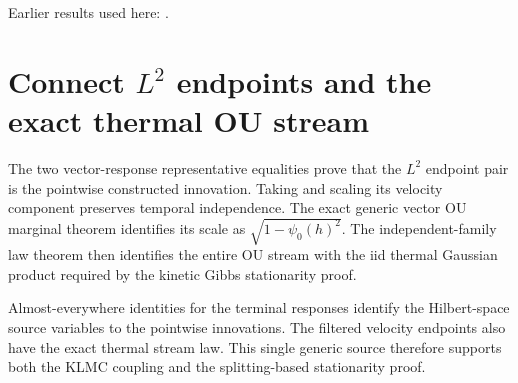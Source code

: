 \documentclass[11pt,a4paper]{article}
\begin{document}
Earlier results used here: \cite[Section~3.8.17]{LangevinLean2026ULASC}.

\section{\texorpdfstring{Connect \(L^{2}\) endpoints and the exact thermal OU stream}{Connect L² endpoints and the exact thermal OU stream}}


The two vector-response representative equalities prove that the \(L^{2}\) endpoint pair is the pointwise constructed innovation. Taking and scaling its velocity component preserves temporal independence. The exact generic vector OU marginal theorem identifies its scale as \(\sqrt{1-\psi_0(h)^2}\). The independent-family law theorem then identifies the entire OU stream with the iid thermal Gaussian product required by the kinetic Gibbs stationarity proof.



Almost-everywhere identities for the terminal responses identify the Hilbert-space source variables to the pointwise innovations. The filtered velocity endpoints also have the exact thermal stream law. This single generic source therefore supports both the KLMC coupling and the splitting-based stationarity proof.
\end{document}
